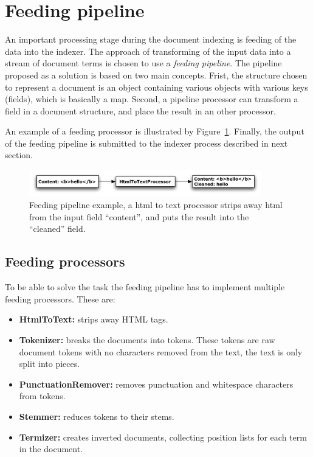 \section{Feeding pipeline}\label{sec:feeding_pipeline}
An important processing stage during the document indexing is feeding of the data into the indexer. The approach of transforming of the input data into a stream of document terms is chosen to use a {\it feeding pipeline}. The pipeline proposed as a solution is based on two main concepts. Frist, the structure chosen to represent a document is an object containing various objects with various keys (fields), which is basically a map. Second, a pipeline processor can transform a field in a document structure, and place the result in an other processor. 

An example of a feeding processor is illustrated by Figure~\ref{fig:feeding_processor}. Finally, the output of the feeding pipeline is submitted to the indexer process described in next section. 

\begin{figure}[htb]
	\centering
	\includegraphics[width=0.9\textwidth]{include/processor.pdf}
	\caption[Feeding pipeline example]{Feeding pipeline example, a html to text processor strips away html from the input field ``content'', and puts the result into the ``cleaned'' field.}\label{fig:feeding_processor}
\end{figure}

\subsection{Feeding processors}\label{sub:implemented_feeding_processors}
To be able to solve the task the feeding pipeline has to implement multiple feeding processors. These are:

\begin{itemize}
	\item \textbf{HtmlToText:} strips away HTML tags.
	\item \textbf{Tokenizer:} breaks the documents into tokens. These tokens are raw document tokens with no characters removed from the text, the text is only split into pieces.
	\item \textbf{PunctuationRemover:} removes punctuation and whitespace characters from tokens. 
	\item \textbf{Stemmer:} reduces tokens to their stems. 
	\item \textbf{Termizer:} creates inverted documents, collecting position lists for each term in the document.
\end{itemize}


